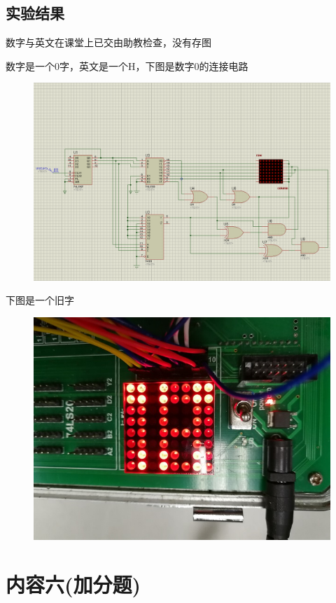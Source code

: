 \documentclass[11pt,UTF8]{ctexart}
\begin{document}
\subsection{实验结果}
\par 数字与英文在课堂上已交由助教检查，没有存图
\par 数字是一个0字，英文是一个H，下图是数字0的连接电路
\begin{figure}[H]
    \centering
    \includegraphics[width=0.9\linewidth]{fig/lattice0.PNG}
\end{figure}
\par 下图是一个旧字
\begin{figure}[H]
    \centering
    \includegraphics[width=0.9\linewidth]{fig/word.jpg}
\end{figure}


\section{内容六(加分题)}
\end{document}
